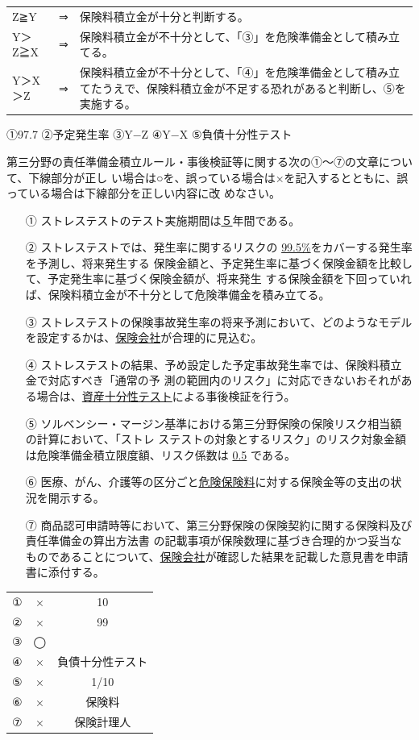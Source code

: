\documentclass[report,gutter=10mm,fore-edge=10mm,uplatex,dvipdfmx]{jlreq}
\begin{document}
  \begin{tabularx}{\linewidth}[b]{lcX}
 Z≧Y&⇒ & 保険料積立金が十分と判断する。\\
 Y＞Z≧X& ⇒&保険料積立金が不十分として、「③」を危険準備金として積み立てる。\\
Y＞X＞Z &⇒&保険料積立金が不十分として、「④」を危険準備金として積み立てたうえで、保険料積立金が不足する恐れがあると判断し、⑤を実施する。\\
\end{tabularx}

①97.7
②予定発生率
③Y−Z
④Y−X
⑤負債十分性テスト

第三分野の責任準備金積立ルール・事後検証等に関する次の①～⑦の文章について、下線部分が正し
い場合は○を、誤っている場合は×を記入するとともに、誤っている場合は下線部分を正しい内容に改
めなさい。
\begin{itemize}
 \item [①] ストレステストのテスト実施期間は\underline{５}年間である。
 \item [②] ストレステストでは、発生率に関するリスクの \underline{99.5\%}をカバーする発生率を予測し、将来発生する
保険金額と、予定発生率に基づく保険金額を比較して、予定発生率に基づく保険金額が、将来発生
する保険金額を下回っていれば、保険料積立金が不十分として危険準備金を積み立てる。
 \item [③] ストレステストの保険事故発生率の将来予測において、どのようなモデルを設定するかは、\underline{保険会社}が合理的に見込む。
 \item [④] ストレステストの結果、予め設定した予定事故発生率では、保険料積立金で対応すべき「通常の予
測の範囲内のリスク」に対応できないおそれがある場合は、\underline{資産十分性テスト}による事後検証を行う。
 \item [⑤] ソルベンシー・マージン基準における第三分野保険の保険リスク相当額の計算において、「ストレ
ステストの対象とするリスク」のリスク対象金額は危険準備金積立限度額、リスク係数は \underline{0.5} である。
 \item [⑥] 医療、がん、介護等の区分ごと\underline{危険保険料}に対する保険金等の支出の状況を開示する。
 \item [⑦] 商品認可申請時等において、第三分野保険の保険契約に関する保険料及び責任準備金の算出方法書
の記載事項が保険数理に基づき合理的かつ妥当なものであることについて、\underline{保険会社}が確認した結果を記載した意見書を申請書に添付する。

\end{itemize}

\begin{tabular}{|c|c|c|}
 \hline
 ①&× & 10 \\
 ②&×& 99\\
 ③&◯& \\
 ④&×& 負債十分性テスト\\
 ⑤&× & 1/10 \\
 ⑥&× & 保険料 \\
 ⑦&× & 保険計理人 \\
 \hline
\end{tabular}
\end{document}
